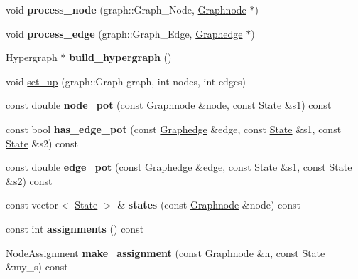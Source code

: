 \begin{DoxyCompactItemize}
\item 
\hypertarget{classMRF_a3a2f7eb349a7345abfba2c5869f85b1f}{
void {\bfseries process\_\-node} (graph::Graph\_\-Node, \hyperlink{classScarab_1_1Graph_1_1Graphnode}{Graphnode} $\ast$)}
\label{classMRF_a3a2f7eb349a7345abfba2c5869f85b1f}

\item 
\hypertarget{classMRF_aed7b8a7a2e3af7c14b501040630e9589}{
void {\bfseries process\_\-edge} (graph::Graph\_\-Edge, \hyperlink{classScarab_1_1Graph_1_1Graphedge}{Graphedge} $\ast$)}
\label{classMRF_aed7b8a7a2e3af7c14b501040630e9589}

\item 
\hypertarget{classMRF_a34f0d586337501d668a62726eb0046d7}{
Hypergraph $\ast$ {\bfseries build\_\-hypergraph} ()}
\label{classMRF_a34f0d586337501d668a62726eb0046d7}

\item 
void \hyperlink{classMRF_a928f19f948fa97796462fd9542a985fd}{set\_\-up} (graph::Graph graph, int nodes, int edges)
\item 
\hypertarget{classMRF_a3a7f11091d96ab8b2f830deb343fc3a6}{
const double {\bfseries node\_\-pot} (const \hyperlink{classScarab_1_1Graph_1_1Graphnode}{Graphnode} \&node, const \hyperlink{structState}{State} \&s1) const }
\label{classMRF_a3a7f11091d96ab8b2f830deb343fc3a6}

\item 
\hypertarget{classMRF_ab73d5f7b51c206754bee9eea9405c0fb}{
const bool {\bfseries has\_\-edge\_\-pot} (const \hyperlink{classScarab_1_1Graph_1_1Graphedge}{Graphedge} \&edge, const \hyperlink{structState}{State} \&s1, const \hyperlink{structState}{State} \&s2) const }
\label{classMRF_ab73d5f7b51c206754bee9eea9405c0fb}

\item 
\hypertarget{classMRF_a9f98956295352e9bfc9917328999c1b2}{
const double {\bfseries edge\_\-pot} (const \hyperlink{classScarab_1_1Graph_1_1Graphedge}{Graphedge} \&edge, const \hyperlink{structState}{State} \&s1, const \hyperlink{structState}{State} \&s2) const }
\label{classMRF_a9f98956295352e9bfc9917328999c1b2}

\item 
\hypertarget{classMRF_a7c01a68384b81d1ba7d24508f767d216}{
const vector$<$ \hyperlink{structState}{State} $>$ \& {\bfseries states} (const \hyperlink{classScarab_1_1Graph_1_1Graphnode}{Graphnode} \&node) const }
\label{classMRF_a7c01a68384b81d1ba7d24508f767d216}

\item 
\hypertarget{classMRF_aaf17c4a671ea4f06553c33fca90bfa35}{
const int {\bfseries assignments} () const }
\label{classMRF_aaf17c4a671ea4f06553c33fca90bfa35}

\item 
\hypertarget{classMRF_a9326b3fd5aea915a1bb8a1ad2ac50f3f}{
\hyperlink{structNodeAssignment}{NodeAssignment} {\bfseries make\_\-assignment} (const \hyperlink{classScarab_1_1Graph_1_1Graphnode}{Graphnode} \&n, const \hyperlink{structState}{State} \&my\_\-s) const }
\label{classMRF_a9326b3fd5aea915a1bb8a1ad2ac50f3f}

\end{DoxyCompactItemize}


